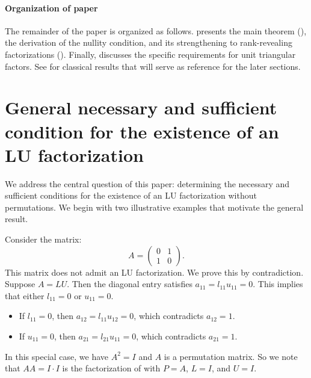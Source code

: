 \documentclass[final]{siamart1116}
\numberwithin{theorem}{section}
\begin{document}
\paragraph{Organization of paper}
The remainder of the paper is organized as follows.  presents the main theorem (), the derivation of the nullity condition, and its strengthening to rank-revealing factorizations (). Finally,  discusses the specific requirements for unit triangular factors. See  for classical results that will serve as reference for the later sections.

\section{General necessary and sufficient condition for the existence of an LU factorization}\label{sec:main}

We address the central question of this paper: determining the necessary and sufficient conditions for the existence of an LU factorization without permutations. We begin with two illustrative examples that motivate the general result.

Consider the matrix:
\[
  A =
  \begin{pmatrix} 0 & 1 \\ 1 & 0
  \end{pmatrix} .
\]
This matrix does not admit an LU factorization. We prove this by contradiction. Suppose $A = LU$. Then the diagonal entry satisfies $a_{11} = l_{11} u_{11} = 0$. This implies that either $l_{11} = 0$ or $u_{11} = 0$.
\begin{itemize}
  \item If $l_{11} = 0$, then $a_{12} = l_{11} u_{12} = 0$, which contradicts $a_{12} = 1$.
  \item If $u_{11} = 0$, then $a_{21} = l_{21} u_{11} = 0$, which contradicts $a_{21} = 1$.
\end{itemize}

In this special case, we have $A^2 = I$ and $A$ is a permutation matrix. So we note that $A A = I \cdot I$ is the factorization of  with $P = A$, $L = I$, and $U = I$.
\end{document}
